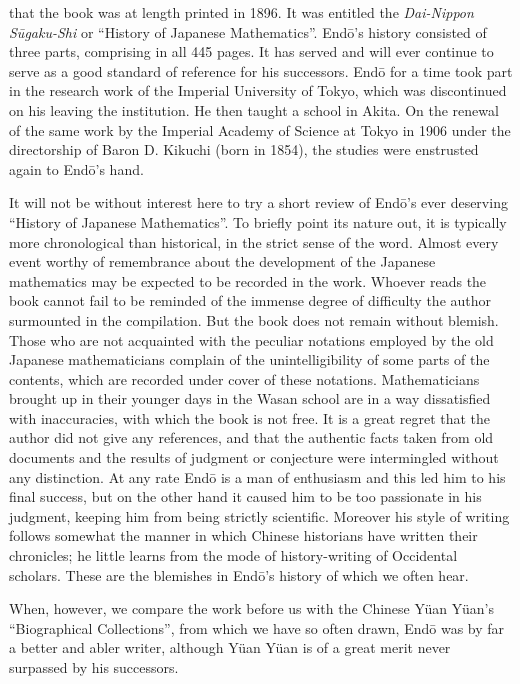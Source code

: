 \documentclass[11pt]{article}
\newcommand{\scanpage}[2]{\clearpage\setcounter{footnote}{0}\noindent{\footnotesize\color{gray}PDF page #1 · #2}\par\medskip}
\begin{document}
\scanpage{0342}{printed page 328}
\noindent that the book was at length printed in 1896. It was entitled the \emph{Dai-Nippon Sūgaku-Shi} or ``History of Japanese Mathematics''. Endō's history consisted of three parts, comprising in all 445 pages. It has served and will ever continue to serve as a good standard of reference for his successors. Endō for a time took part in the research work of the Imperial University of Tokyo, which was discontinued on his leaving the institution. He then taught a school in Akita. On the renewal of the same work by the Imperial Academy of Science at Tokyo in 1906 under the directorship of Baron D. Kikuchi (born in 1854), the studies were enstrusted again to Endō's hand.

It will not be without interest here to try a short review of Endō's ever deserving ``History of Japanese Mathematics''. To briefly point its nature out, it is typically more chronological than historical, in the strict sense of the word. Almost every event worthy of remembrance about the development of the Japanese mathematics may be expected to be recorded in the work. Whoever reads the book cannot fail to be reminded of the immense degree of difficulty the author surmounted in the compilation. But the book does not remain without blemish. Those who are not acquainted with the peculiar notations employed by the old Japanese mathematicians complain of the unintelligibility of some parts of the contents, which are recorded under cover of these notations. Mathematicians brought up in their younger days in the Wasan school are in a way dissatisfied with inaccuracies, with which the book is not free. It is a great regret that the author did not give any references, and that the authentic facts taken from old documents and the results of judgment or conjecture were intermingled without any distinction. At any rate Endō is a man of enthusiasm and this led him to his final success, but on the other hand it caused him to be too passionate in his judgment, keeping him from being strictly scientific. Moreover his style of writing follows somewhat the manner in which Chinese historians have written their chronicles; he little learns from the mode of history-writing of Occidental scholars. These are the blemishes in Endō's history of which we often hear.

When, however, we compare the work before us with the Chinese Yüan Yüan's ``Biographical Collections'', from which we have so often drawn, Endō was by far a better and abler writer, although Yüan Yüan is of a great merit never surpassed by his successors.
\end{document}
